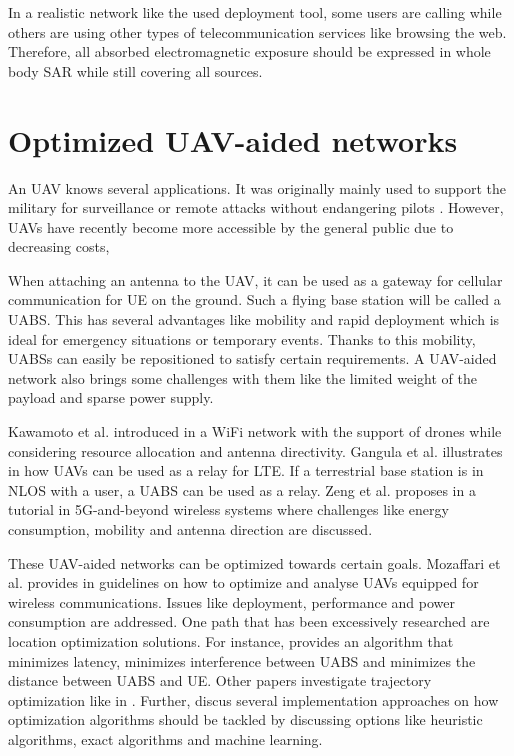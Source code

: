 In a realistic network like the used deployment tool, some users are calling while others are using other types of telecommunication services like browsing the web.
Therefore, all absorbed electromagnetic exposure should be expressed in whole body SAR while still covering all sources.

\section{Optimized UAV-aided networks}

An \gls{UAV} knows several applications. It was originally mainly used to support the military for surveillance or remote attacks without 
endangering pilots \cite{U12}. However, \gls{UAV}s have recently become more accessible by the general public due to decreasing costs, 

When attaching an antenna to the \gls{UAV}, it can be used as a gateway for cellular communication for \gls{UE} on the ground.
Such a flying base station will be called a \gls{UABS}. 
This has several advantages like mobility and rapid deployment which is ideal for emergency situations or temporary events. Thanks to this mobility,  
\gls{UABS}s can easily be repositioned to satisfy certain requirements. A \gls{UAV}-aided network also brings some challenges with them like 
the limited weight of the payload and sparse power supply.

Kawamoto et al. introduced in \cite{U11} a WiFi network with the support of drones while considering resource allocation 
and antenna directivity. 
Gangula et al. illustrates in \cite{U10} how \gls{UAV}s can be  used as a relay for \gls{LTE}. 
If a terrestrial base station is in \gls{NLOS} with a user, a
\gls{UABS} can be used as a relay.
Zeng et al. proposes in  \cite{U12} a tutorial in 5G-and-beyond wireless systems where challenges like 
energy consumption, mobility and antenna direction are discussed. 

These \gls{UAV}-aided networks can be optimized towards certain goals.
Mozaffari et al. provides in \cite{U3} guidelines on how to optimize and analyse \gls{UAV}s equipped for 
wireless communications. Issues like deployment, performance and power consumption are addressed.
One path that has been excessively researched are location optimization solutions.
For instance, \cite{U4} provides an algorithm that minimizes latency, \cite{U7,U9}  minimizes interference between \gls{UABS} and \cite{U8} minimizes the 
distance between \gls{UABS} and \gls{UE}. Other papers investigate trajectory optimization like in \cite{U6,U7}.
Further, \cite{U3,U5} discus several implementation approaches on how optimization algorithms should be tackled by discussing options like 
heuristic algorithms, exact algorithms and machine learning. 


